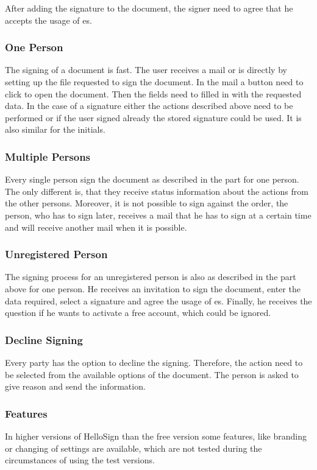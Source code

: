 After adding the signature to the document, the signer need to agree that he accepts the usage of \gls{es}.

\subsubsection{One Person}
The signing of a document is fast. The user receives a mail or is directly by setting up the file requested to sign the document. In the mail a button need to click to open the document. Then the fields need to filled in with the requested data. In the case of a signature either the actions described above need to be performed or if the user signed already the stored signature could be used. It is also similar for the initials.

\subsubsection{Multiple Persons}
Every single person sign the document as described in the part for one person. The only different is, that they receive status information about the actions from the other persons. Moreover, it is not possible to sign against the order, the person, who has to sign later, receives a mail that he has to sign at a certain time and will receive another mail when it is possible.

\subsubsection{Unregistered Person}
The signing process for an unregistered person is also as described in the part above for one person. He receives an invitation to sign the document, enter the data required, select a signature and agree the usage of \gls{es}. Finally, he receives the question if he wants to activate a free account, which could be ignored.

\subsubsection{Decline Signing}
Every party has the option to decline the signing. Therefore, the action need to be selected from the available options of the document. The person is asked to give reason and send the information.

\subsubsection{Features}
In higher versions of HelloSign than the free version some features, like branding or changing of settings are available, which are not tested during the circumstances of using the test versions. 

